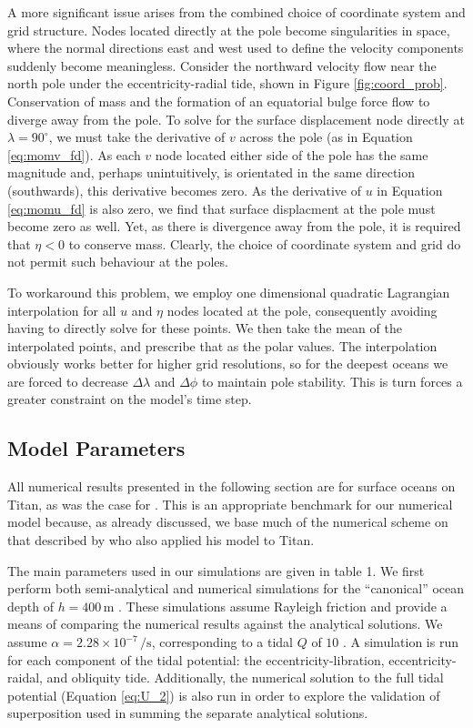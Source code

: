 A more significant issue arises from the combined choice of coordinate system and grid structure. Nodes located directly at the pole become singularities in space, where the normal directions east and west used to define the velocity components suddenly become meaningless. Consider the northward velocity flow near the north pole under the eccentricity-radial tide, shown in Figure \ref{fig:coord_prob}. Conservation of mass and the formation of an equatorial bulge force flow to diverge away from the pole. To solve for the surface displacement node directly at $\lambda = 90^{\circ}$, we must take the derivative of $v$ across the pole (as in Equation \ref{eq:momv_fd}). As each $v$ node located either side of the pole has the same magnitude and, perhaps unintuitively, is orientated in the same direction (southwards), this derivative becomes zero. As the derivative of $u$ in Equation \ref{eq:momu_fd} is also zero, we find that surface displacment at the pole must become zero as well. Yet, as there is divergence away from the pole, it is required that $\eta < 0$ to conserve mass. Clearly, the choice of coordinate system and grid do not permit such behaviour at the poles. 

To workaround this problem, we employ one dimensional quadratic Lagrangian interpolation for all $u$ and $\eta$ nodes located at the pole, consequently avoiding having to directly solve for these points. We then take the mean of the interpolated points, and prescribe that as the polar values. The interpolation obviously works better for higher grid resolutions, so for the deepest oceans we are forced to decrease $\Delta \lambda$ and $\Delta \phi$ to maintain pole stability. This is turn forces a greater constraint on the model's time step.

\subsection{Model Parameters \label{subsec:param}}



All numerical results presented in the following section are for surface oceans on Titan, as was the case for \citet{sears1995tidal,sohl1995tidal}. This is an appropriate benchmark for our numerical model because, as already discussed, we base much of the numerical scheme on that described by \citet{sears1995tidal} who also applied his model to Titan.

The main parameters used in our simulations are given in table 1. We first perform both semi-analytical and numerical simulations for the ``canonical'' ocean depth of $h=400 \, \si{\metre}$ \citep{sagan1982tide,sears1995tidal}. These simulations assume Rayleigh friction and provide a means of comparing the numerical results against the analytical solutions. We assume \hbox{$\alpha = 2.28 \times 10^{-7} \, \si{\per\second}$}, corresponding to a tidal $Q$ of $10$ \citep{tyler2011tidal}. A simulation is run for each component of the tidal potential: the eccentricity-libration, eccentricity-raidal, and obliquity tide. Additionally, the numerical solution to the full tidal potential (Equation \ref{eq:U_2}) is also run in order to explore the validation of superposition used in summing the separate analytical solutions.

